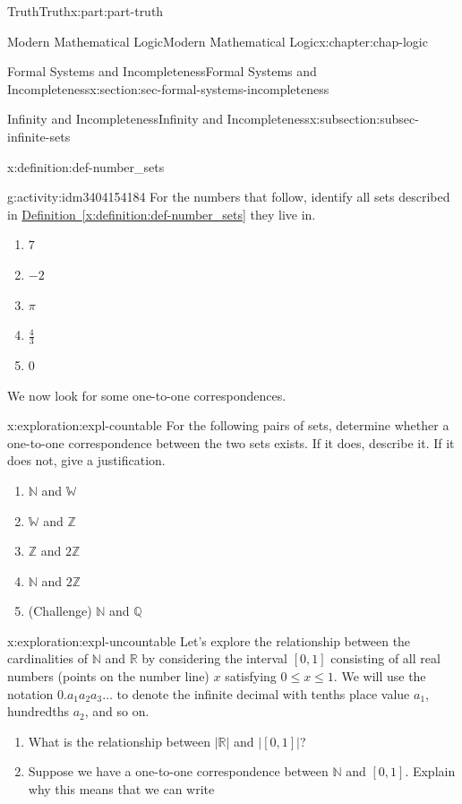 \documentclass[oneside,10pt,]{book}
\newcommand{\xreffont}{\relax}
\numberwithin{equation}{section}
\renewcommand{\le}{\leqslant}
\begin{document}
\begin{partptx}{Truth}{}{Truth}{}{}{x:part:part-truth}
\begin{chapterptx}{Modern Mathematical Logic}{}{Modern Mathematical Logic}{}{}{x:chapter:chap-logic}
\begin{sectionptx}{Formal Systems and Incompleteness}{}{Formal Systems and Incompleteness}{}{}{x:section:sec-formal-systems-incompleteness}
\begin{subsectionptx}{Infinity and Incompleteness}{}{Infinity and Incompleteness}{}{}{x:subsection:subsec-infinite-sets}
\begin{definition}{}{x:definition:def-number_sets}
\begin{enumerate}
\end{enumerate}
\end{definition}
\begin{activity}{}{g:activity:idm3404154184}%
For the numbers that follow, identify all sets described in \hyperref[x:definition:def-number_sets]{Definition~{\xreffont\ref{x:definition:def-number_sets}}} they live in.%
%
\begin{enumerate}
\item{}\(\displaystyle 7\)%
\item{}\(\displaystyle -2\)%
\item{}\(\displaystyle \pi\)%
\item{}\(\displaystyle \frac{4}{3}\)%
\item{}\(\displaystyle 0\)%
\end{enumerate}
\end{activity}%
We now look for some one-to-one correspondences.%
\begin{exploration}{}{x:exploration:expl-countable}%
For the following pairs of sets, determine whether a one-to-one correspondence between the two sets exists. If it does, describe it. If it does not, give a justification.%
%
\begin{enumerate}
\item{}\(\mathbb{N}\) and \(\mathbb{W}\)%
\item{}\(\mathbb{W}\) and \(\mathbb{Z}\)%
\item{}\(\mathbb{Z}\) and \(2\mathbb{Z}\)%
\item{}\(\mathbb{N}\) and \(2\mathbb{Z}\)%
\item{}(Challenge) \(\mathbb{N}\) and \(\mathbb{Q}\)%
\end{enumerate}
\end{exploration}%
\begin{exploration}{}{x:exploration:expl-uncountable}%
Let's explore the relationship between the cardinalities of \(\mathbb{N}\) and \(\mathbb{R}\) by considering the interval \([0,1]\) consisting of all real numbers (points on the number line) \(x\) satisfying \(0 \le x \le 1\). We will use the notation \(0.a_1 a_2 a_3 \ldots\) to denote the infinite decimal with tenths place value \(a_1\), hundredths \(a_2\), and so on.%
%
\begin{enumerate}
\item{}What is the relationship between \(|\mathbb{R}|\) and \(|[0,1]|\)?%
\item{}Suppose we have a one-to-one correspondence between \(\mathbb{N}\) and \([0,1]\). Explain why this means that we can write%

\end{enumerate}
\end{exploration}
\end{subsectionptx}
\end{sectionptx}
\end{chapterptx}
\end{partptx}
\end{document}
